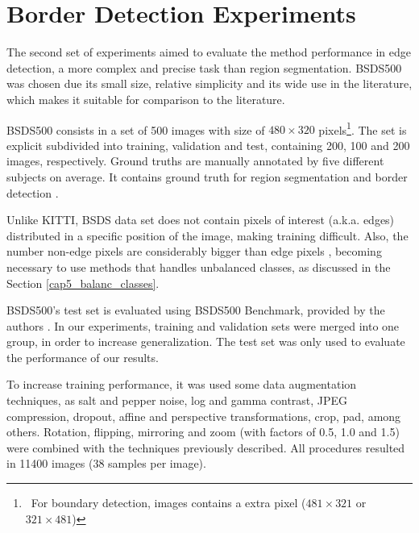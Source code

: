 \section{Border Detection Experiments}
\label{cap6_result_experm_2}

The second set of experiments aimed to evaluate the method performance  in edge detection, a more complex and precise task than region segmentation.
BSDS500 was chosen due its small size, relative simplicity and its wide use in the literature, which makes it suitable for comparison to the literature.

BSDS500 consists in a set of 500 images with size of $480 \times 320$ pixels\footnote{~For boundary detection, images contains a extra pixel ($481 \times 321$ or $321 \times 481$)}.
The set is explicit subdivided into training, validation and test, containing 200, 100 and 200 images, respectively.
Ground truths are manually annotated by five different subjects on average. 
It contains ground truth for region segmentation and border detection \cite{amfm_pami2011}.

Unlike KITTI, BSDS data set does not contain pixels of interest (a.k.a. edges) distributed in a specific position of the image, making training difficult.
Also, the number non-edge pixels are considerably bigger than edge pixels \cite{ReExtraction:Wen201884}, becoming necessary to use methods that handles unbalanced classes, as discussed in the Section \ref{cap5_balanc_classes}.


BSDS500's test set is evaluated using BSDS500 Benchmark, provided by the authors \cite{amfm_pami2011}.
In our experiments, training and validation sets were merged into one group, in order to increase generalization.
The test set was only used to evaluate the performance of our results.

To increase training performance, it was used some data augmentation techniques, as salt and pepper noise, log and gamma contrast, JPEG compression, dropout, affine and perspective transformations, crop, pad, among others.
Rotation, flipping, mirroring and zoom (with factors of 0.5, 1.0 and 1.5) were combined with the techniques previously described.
All procedures resulted in 11400 images (38 samples per image).%

